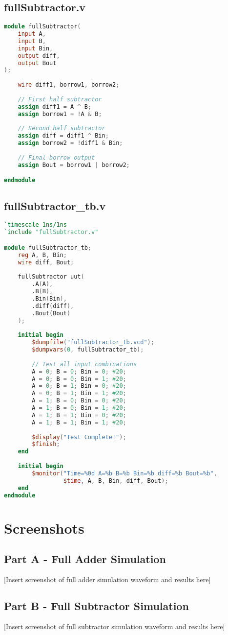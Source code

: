 \documentclass[a4paper,12pt]{article}
\begin{document}
\newpage

\subsection*{fullSubtractor.v}
\begin{lstlisting}[language=Verilog]
module fullSubtractor(
    input A,
    input B,
    input Bin,
    output diff,
    output Bout
);
    
    wire diff1, borrow1, borrow2;
    
    // First half subtractor
    assign diff1 = A ^ B;
    assign borrow1 = !A & B;
    
    // Second half subtractor
    assign diff = diff1 ^ Bin;
    assign borrow2 = !diff1 & Bin;
    
    // Final borrow output
    assign Bout = borrow1 | borrow2;

endmodule
\end{lstlisting}

\newpage

\subsection*{fullSubtractor\_tb.v}
\begin{lstlisting}[language=Verilog]
`timescale 1ns/1ns
`include "fullSubtractor.v"

module fullSubtractor_tb;
    reg A, B, Bin;
    wire diff, Bout;
    
    fullSubtractor uut(
        .A(A),
        .B(B),
        .Bin(Bin),
        .diff(diff),
        .Bout(Bout)
    );
    
    initial begin
        $dumpfile("fullSubtractor_tb.vcd");
        $dumpvars(0, fullSubtractor_tb);
        
        // Test all input combinations
        A = 0; B = 0; Bin = 0; #20;
        A = 0; B = 0; Bin = 1; #20;
        A = 0; B = 1; Bin = 0; #20;
        A = 0; B = 1; Bin = 1; #20;
        A = 1; B = 0; Bin = 0; #20;
        A = 1; B = 0; Bin = 1; #20;
        A = 1; B = 1; Bin = 0; #20;
        A = 1; B = 1; Bin = 1; #20;
        
        $display("Test Complete!");
        $finish;
    end
    
    initial begin
        $monitor("Time=%0d A=%b B=%b Bin=%b diff=%b Bout=%b",
                 $time, A, B, Bin, diff, Bout);
    end
endmodule
\end{lstlisting}

\section*{Screenshots}
\subsection*{Part A - Full Adder Simulation}
[Insert screenshot of full adder simulation waveform and results here]

\subsection*{Part B - Full Subtractor Simulation}
[Insert screenshot of full subtractor simulation waveform and results here]
\end{document}
